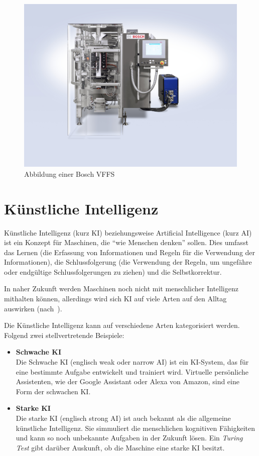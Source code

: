\begin{figure}[h]
    \centering
    \includegraphics[scale=0.2]{images/kapitel_2/bosch_vffs.jpg}
    \caption{Abbildung einer Bosch VFFS}
    \label{fig:grundlagen_boschvffs}
\end{figure}

\section{Künstliche Intelligenz}
Künstliche Intelligenz (kurz KI) beziehungsweise Artificial Intelligence (kurz AI) ist ein Konzept für Maschinen, die
\enquote{wie Menschen denken} sollen. Dies umfasst das Lernen (die Erfassung von Informationen und Regeln für die
Verwendung der Informationen), die Schlussfolgerung (die Verwendung der Regeln, um ungefähre oder endgültige
Schlussfolgerungen zu ziehen) und die Selbstkorrektur.

In naher Zukunft werden Maschinen noch nicht mit menschlicher Intelligenz mithalten können, allerdings wird sich KI auf
viele Arten auf den Alltag auswirken (nach~\cite{article_grundlagen_ki}).

Die Künstliche Intelligenz kann auf verschiedene Arten kategorisiert werden. Folgend zwei stellvertretende Beispiele:

\begin{itemize}
    \item \textbf{Schwache KI} \\
    Die Schwache KI (englisch weak oder narrow AI) ist ein KI-System, das für eine bestimmte Aufgabe entwickelt und
    trainiert wird. Virtuelle persönliche Assistenten, wie der Google Assistant oder Alexa von Amazon, sind eine Form
    der schwachen KI.
    \item \textbf{Starke KI} \\
    Die starke KI (englisch strong AI) ist auch bekannt als die allgemeine künstliche Intelligenz. Sie simmuliert die
    menschlichen kognitiven Fähigkeiten und kann so noch unbekannte Aufgaben in der Zukunft lösen. Ein
    \textit{Turing Test} gibt darüber Auskunft, ob die Maschine eine starke KI besitzt.
\end{itemize}


